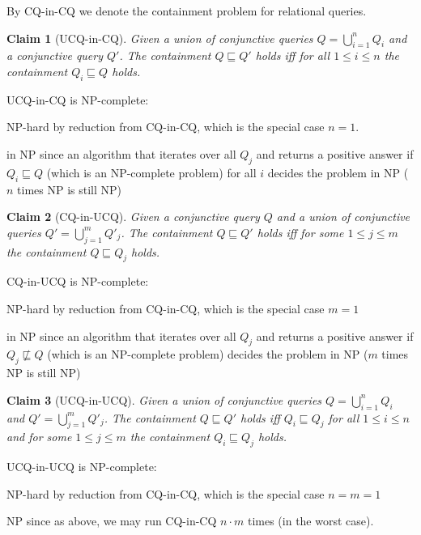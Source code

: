 \documentclass[a4paper,12pt]{article}
\newtheorem{claim}{Claim}
\begin{document}
By CQ-in-CQ we denote the containment problem for relational queries.

\begin{claim}[UCQ-in-CQ]
Given a union of conjunctive queries $Q = \bigcup_{i=1}^n Q_i$ and a conjunctive query $Q'$. The containment $Q \sqsubseteq Q'$ holds iff for all $1 \leq i \leq n$ the containment $Q_i \sqsubseteq Q$ holds.
\end{claim}

UCQ-in-CQ is NP-complete:

\begin{description}
\item{NP-hard} by reduction from CQ-in-CQ, which is the special case $n = 1$.
\item{in NP} since an algorithm that iterates over all $Q_j$ and returns a positive answer if $Q_i \sqsubseteq Q$ (which is an NP-complete problem) for all $i$ decides the problem in NP ($n$ times NP is still NP)
\end{description}

\begin{claim}[CQ-in-UCQ]
Given a conjunctive query $Q$ and a union of conjunctive queries $Q' = \bigcup_{j=1}^m Q'_j$. The containment $Q \sqsubseteq Q'$ holds iff for some $1 \leq j \leq m$ the containment $Q \sqsubseteq Q_j$ holds.
\end{claim}

CQ-in-UCQ is NP-complete:

\begin{description}
\item{NP-hard} by reduction from CQ-in-CQ, which is the special case $m = 1$
\item{in NP} since an algorithm that iterates over all $Q_j$ and returns a positive answer if $Q_j \not \sqsubseteq Q$ (which is an NP-complete problem) decides the problem in NP ($m$ times NP is still NP)
\end{description}

\begin{claim}[UCQ-in-UCQ]
Given a union of conjunctive queries $Q = \bigcup_{i=1}^n Q_i$ and $Q' = \bigcup_{j=1}^m Q'_j$. The containment $Q \sqsubseteq Q'$ holds iff $Q_i \sqsubseteq Q_j$ for all $1 \leq i \leq n$ and for some $1 \leq j \leq m$ the containment $Q_i \sqsubseteq Q_j$ holds.
\end{claim}

UCQ-in-UCQ is NP-complete:

\begin{description}
\item{NP-hard} by reduction from CQ-in-CQ, which is the special case $n = m = 1$
\item{NP} since as above, we may run CQ-in-CQ $n \cdot m$ times (in the worst case).
\end{description}
\end{document}
